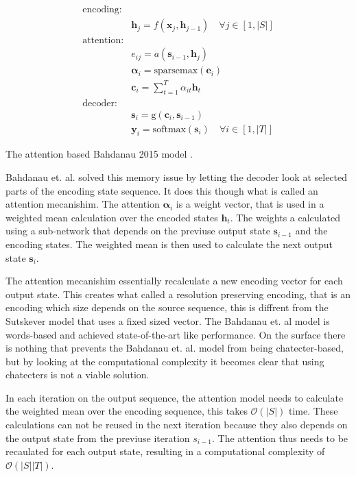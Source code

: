 \begin{equationbox}[H]
\begin{equation*}
\begin{aligned}
\text{encoding:} & \\
& \mathbf{h}_j = f(\mathbf{x}_j, \mathbf{h}_{j-1}) \quad \forall j \in [1, |S|] \\
\text{attention:} & \\
& e_{ij} = a(\mathbf{s}_{i-1}, \mathbf{h}_j) \\
& \bm{\alpha}_i = \mathrm{sparsemax}(\mathbf{e}_i) \\
& \mathbf{c}_i = {\textstyle \sum_{t=1}^T} \alpha_{it} \mathbf{h}_t \\
\text{decoder:} & \\
&\mathbf{s}_i = \mathrm{g}(\mathbf{c}_i, \mathbf{s}_{i-1}) \\
&\mathbf{y}_i = \mathrm{softmax}(\mathbf{s}_i) \quad \forall i \in [1, |T|] 
\end{aligned}
\end{equation*}
\caption{The attention based Bahdanau 2015 model \cite{bahdanau-2015-nmt}.}
\end{equationbox}

Bahdanau et. al. solved this memory issue by letting the decoder look at selected parts of the encoding state sequence. It does this though what is called an attention mecanishim. The attention $\bm{\alpha}_i$ is a weight vector, that is used in a weighted mean calculation over the encoded states $\mathbf{h}_t$. The weights a calculated using a sub-network that depends on the previuse output state $\mathbf{s}_{i-1}$ and the encoding states. The weighted mean is then used to calculate the next output state $\mathbf{s}_{i}$.

The attention mecanishim essentially recalculate a new encoding vector for each output state. This creates what called a resolution preserving encoding, that is an encoding which size depends on the source sequence, this is diffrent from the Sutskever model that uses a fixed sized vector. The Bahdanau et. al model is words-based and achieved state-of-the-art like performance. On the surface there is nothing that prevents the Bahdanau et. al. model from being chatecter-based, but by looking at the computational complexity it becomes clear that using chatecters is not a viable solution.

In each iteration on the output sequence, the attention model needs to calculate the weighted mean over the encoding sequence, this takes $\mathcal{O}(|S|)$ time. These calculations can not be reused in the next iteration because they also depends on the output state from the previuse iteration $s_{i-1}$. The attention thus needs to be recaulated for each output state, resulting in a computational complexity of $\mathcal{O}(|S||T|)$.

